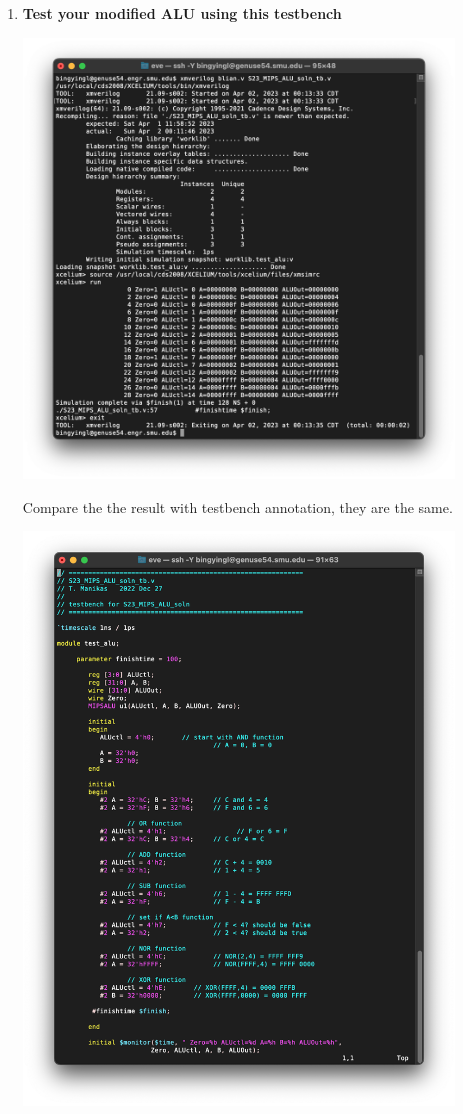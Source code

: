 \documentclass[12pt]{article}
\begin{document}
\begin{enumerate}
    \item \textbf{Test your modified ALU using this testbench}
            \begin{center}
        \includegraphics[width=0.9\textwidth]{p4.png}
    \end{center}
    Compare the the result with testbench annotation, they are the same.
                \begin{center}
        \includegraphics[width=0.9\textwidth]{p5.png}

\end{center}
\end{enumerate}
\end{document}
